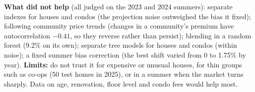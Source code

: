 \textbf{What did not help} (all judged on the 2023 and 2024 summers): separate indexes for houses and
condos (the projection noise outweighed the bias it fixed); following community price trends (changes in a
community's premium have autocorrelation $-0.41$, so they reverse rather than persist); blending in a random
forest (9.2\% on its own); separate tree models for houses and condos (within noise); a fixed summer bias correction (the best shift varied from 0 to 1.75\% by year).
\textbf{Limits:} do not trust it for expensive or unusual houses, for thin groups such as co-ops (50 test
homes in 2025), or in a summer when the market turns sharply. Data on age, renovation, floor level and condo
fees would help most.
